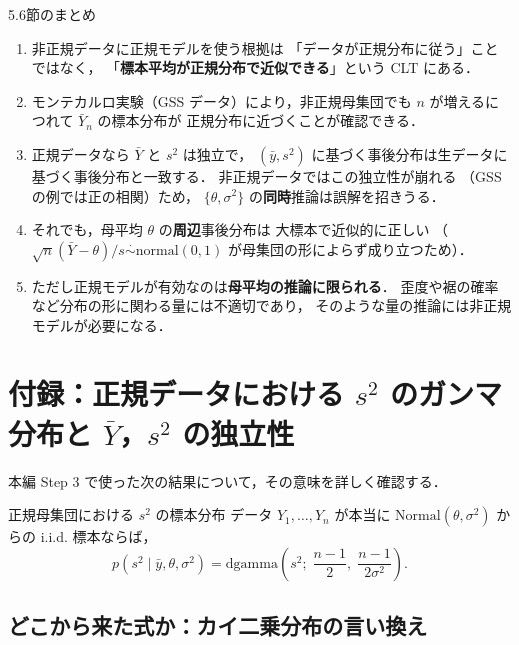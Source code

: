 \documentclass[lualatex,ja=standard,a4paper,12pt]{bxjsarticle}
\begin{document}
\begin{thmbox}{5.6節のまとめ}
\begin{enumerate}
  \item 非正規データに正規モデルを使う根拠は
        「データが正規分布に従う」ことではなく，
        「\textbf{標本平均が正規分布で近似できる}」という CLT にある．

  \item モンテカルロ実験（GSS データ）により，非正規母集団でも
        $n$ が増えるにつれて $\bar{Y}_n$ の標本分布が
        正規分布に近づくことが確認できる．

  \item 正規データなら $\bar{Y}$ と $s^2$ は独立で，
        $(\bar{y}, s^2)$ に基づく事後分布は生データに基づく事後分布と一致する．
        非正規データではこの独立性が崩れる
        （GSS の例では正の相関）ため，
        $\{\theta, \sigma^2\}$ の\textbf{同時}推論は誤解を招きうる．

  \item それでも，母平均 $\theta$ の\textbf{周辺}事後分布は
        大標本で近似的に正しい
        （$\sqrt{n}(\bar{Y}-\theta)/s \overset{\cdot}{\sim} \mathrm{normal}(0,1)$
        が母集団の形によらず成り立つため）．

  \item ただし正規モデルが有効なのは\textbf{母平均の推論に限られる}．
        歪度や裾の確率など分布の形に関わる量には不適切であり，
        そのような量の推論には非正規モデルが必要になる．
\end{enumerate}
\end{thmbox}

\appendix
\section{付録：正規データにおける $s^2$ のガンマ分布と
$\bar{Y}$，$s^2$ の独立性}

本編 Step 3 で使った次の結果について，その意味を詳しく確認する．

\begin{thmbox}{正規母集団における $s^2$ の標本分布}
データ $Y_1, \ldots, Y_n$ が本当に $\mathrm{Normal}(\theta, \sigma^2)$
からの i.i.d. 標本ならば，
\[
  p(s^2 \mid \bar{y}, \theta, \sigma^2)
  = \mathrm{dgamma}\!\left(s^2;\;\frac{n-1}{2},\;\frac{n-1}{2\sigma^2}\right).
\]
\end{thmbox}

\subsection{どこから来た式か：カイ二乗分布の言い換え}
\end{document}
